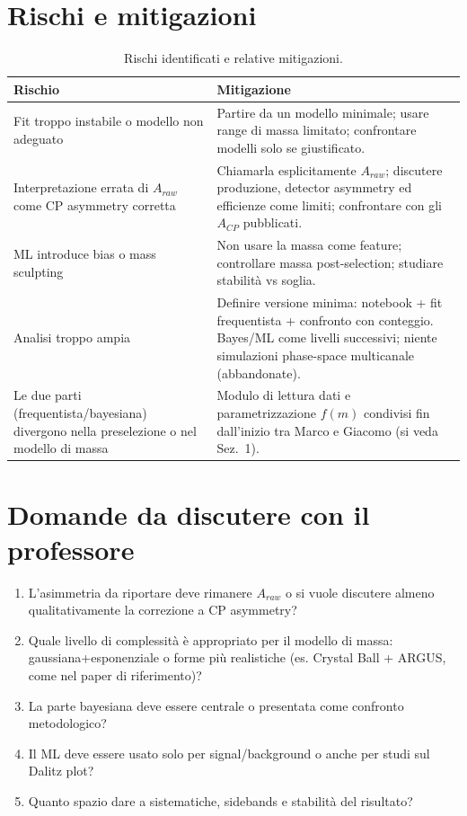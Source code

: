 \documentclass[11pt,a4paper]{article}
\begin{document}
\section{Rischi e mitigazioni}

\begin{table}[h!]
\centering
\begin{tabular}{L{5.5cm} L{7.5cm}}
\toprule
\textbf{Rischio} & \textbf{Mitigazione} \\
\midrule
Fit troppo instabile o modello non adeguato & Partire da un modello minimale; usare range di massa limitato; confrontare modelli solo se giustificato. \\
Interpretazione errata di $A_{raw}$ come CP asymmetry corretta & Chiamarla esplicitamente $A_{raw}$; discutere produzione, detector asymmetry ed efficienze come limiti; confrontare con gli $A_{CP}$ pubblicati. \\
ML introduce bias o mass sculpting & Non usare la massa come feature; controllare massa post-selection; studiare stabilità vs soglia. \\
Analisi troppo ampia & Definire versione minima: notebook + fit frequentista + confronto con conteggio. Bayes/ML come livelli successivi; niente simulazioni phase-space multicanale (abbandonate). \\
Le due parti (frequentista/bayesiana) divergono nella preselezione o nel modello di massa & Modulo di lettura dati e parametrizzazione $f(m)$ condivisi fin dall'inizio tra Marco e Giacomo (si veda Sez.~1). \\
\bottomrule
\end{tabular}
\caption{Rischi identificati e relative mitigazioni.}
\end{table}

\section{Domande da discutere con il professore}
\begin{enumerate}[leftmargin=1.4em]
    \item L'asimmetria da riportare deve rimanere $A_{raw}$ o si vuole discutere almeno qualitativamente la correzione a CP asymmetry?
    \item Quale livello di complessità è appropriato per il modello di massa: gaussiana+esponenziale o forme più realistiche (es. Crystal Ball + ARGUS, come nel paper di riferimento)?
    \item La parte bayesiana deve essere centrale o presentata come confronto metodologico?
    \item Il ML deve essere usato solo per signal/background o anche per studi sul Dalitz plot?
    \item Quanto spazio dare a sistematiche, sidebands e stabilità del risultato?
\end{enumerate}
\end{document}

